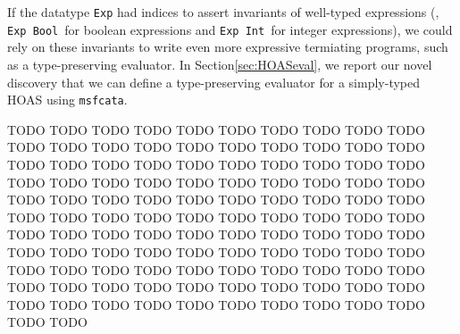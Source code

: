 If the datatype \lstinline{Exp} had indices to assert invariants of
well-typed expressions (\eg, \lstinline{Exp Bool}\, for boolean expressions
and \lstinline{Exp Int}\, for integer expressions), we could rely on these
invariants to write even more expressive termiating programs, such as
a type-preserving evaluator. In Section\;\ref{sec:HOASeval}, we report
our novel discovery that we can define a type-preserving evaluator for
a simply-typed HOAS using \lstinline{msfcata}.

TODO TODO TODO TODO TODO TODO TODO TODO TODO TODO TODO TODO TODO TODO TODO TODO
TODO TODO TODO TODO TODO TODO TODO TODO TODO TODO TODO TODO TODO TODO TODO TODO
TODO TODO TODO TODO TODO TODO TODO TODO TODO TODO TODO TODO TODO TODO TODO TODO
TODO TODO TODO TODO TODO TODO TODO TODO TODO TODO TODO TODO TODO TODO TODO TODO
TODO TODO TODO TODO TODO TODO TODO TODO TODO TODO TODO TODO TODO TODO TODO TODO
TODO TODO TODO TODO TODO TODO TODO TODO TODO TODO TODO TODO TODO TODO TODO TODO
TODO TODO TODO TODO TODO TODO TODO TODO TODO TODO TODO TODO TODO TODO TODO TODO
